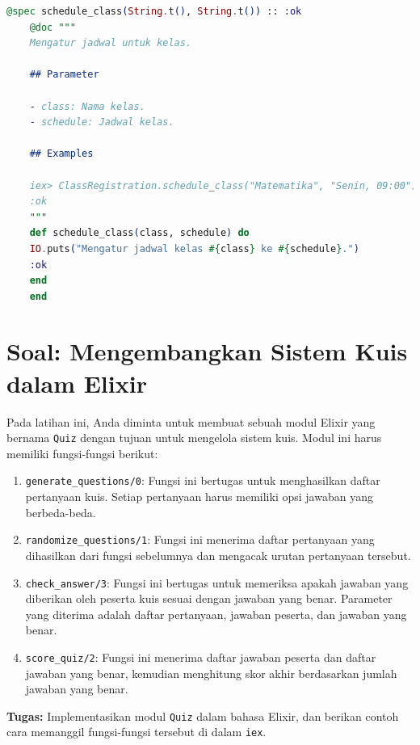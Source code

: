 \begin{lstlisting}[language=Elixir, caption={Modul Pendaftaran Kelas}]
	@spec schedule_class(String.t(), String.t()) :: :ok
	@doc """
	Mengatur jadwal untuk kelas.
	
	## Parameter
	
	- class: Nama kelas.
	- schedule: Jadwal kelas.
	
	## Examples
	
	iex> ClassRegistration.schedule_class("Matematika", "Senin, 09:00")
	:ok
	"""
	def schedule_class(class, schedule) do
	IO.puts("Mengatur jadwal kelas #{class} ke #{schedule}.")
	:ok
	end
	end
\end{lstlisting}


\section{Soal: Mengembangkan Sistem Kuis dalam Elixir}

Pada latihan ini, Anda diminta untuk membuat sebuah modul Elixir yang bernama \texttt{Quiz} dengan tujuan untuk mengelola sistem kuis. Modul ini harus memiliki fungsi-fungsi berikut:

\begin{enumerate}
	\item \texttt{generate\_questions/0}: Fungsi ini bertugas untuk menghasilkan daftar pertanyaan kuis. Setiap pertanyaan harus memiliki opsi jawaban yang berbeda-beda.
	
	\item \texttt{randomize\_questions/1}: Fungsi ini menerima daftar pertanyaan yang dihasilkan dari fungsi sebelumnya dan mengacak urutan pertanyaan tersebut.
	
	\item \texttt{check\_answer/3}: Fungsi ini bertugas untuk memeriksa apakah jawaban yang diberikan oleh peserta kuis sesuai dengan jawaban yang benar. Parameter yang diterima adalah daftar pertanyaan, jawaban peserta, dan jawaban yang benar.
	
	\item \texttt{score\_quiz/2}: Fungsi ini menerima daftar jawaban peserta dan daftar jawaban yang benar, kemudian menghitung skor akhir berdasarkan jumlah jawaban yang benar.
\end{enumerate}

\textbf{Tugas:} Implementasikan modul \texttt{Quiz} dalam bahasa Elixir, dan berikan contoh cara memanggil fungsi-fungsi tersebut di dalam \texttt{iex}.



